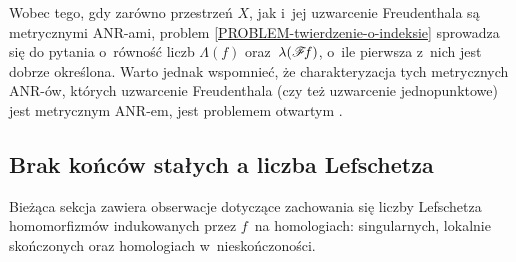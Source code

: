Wobec tego, gdy zarówno przestrzeń $X$, jak i~jej uzwarcenie Freudenthala są metrycznymi \mbox{ANR-ami}, problem \ref{PROBLEM-twierdzenie-o-indeksie} sprowadza się do pytania o~równość liczb $\Lambda(f)$ oraz~$\lambda(\mathscr{F}\! f)$, o~ile pierwsza z~nich jest dobrze określona. Warto jednak wspomnieć, że charakteryzacja tych metrycznych \mbox{ANR-ów}, których uzwarcenie Freudenthala (czy też uzwarcenie jednopunktowe) jest metrycznym \mbox{ANR-em}, jest problemem otwartym \cite[Problem 875]{West90}.

\subsection{Brak końców stałych a liczba Lefschetza}
Bieżąca sekcja zawiera obserwacje dotyczące zachowania się liczby Lefschetza homomorfizmów indukowanych przez $f$~na homologiach: singularnych, lokalnie skończonych oraz homologiach w~nieskończoności.

